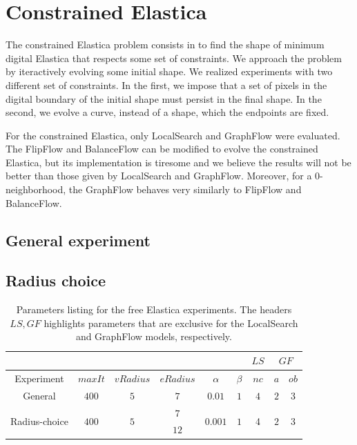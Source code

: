 \section{Constrained Elastica}

The constrained Elastica problem consists in to find the shape of minimum digital Elastica that respects some set of constraints. We approach the problem by iteractively evolving some initial shape. We realized experiments with two different set of constraints. In the first, we impose that a set of pixels in the digital boundary of the initial shape must persist in the final shape. In the second, we evolve a curve, instead of a shape, which the endpoints are fixed. 

For the constrained Elastica, only LocalSearch and GraphFlow were evaluated. The FlipFlow and BalanceFlow can be modified to evolve the constrained Elastica, but its implementation is tiresome and we believe the results will not be better than those given by LocalSearch and GraphFlow. Moreover, for a $0$-neighborhood, the GraphFlow behaves very similarly to FlipFlow and BalanceFlow.

\subsection{General experiment}

\subsection{Radius choice}

\begin{table}
\centering
\begin{tabular}{|c|c|c|c|c|c|c|c|c|}
\cline{7-9}
\multicolumn{6}{c|}{} & $LS$ & \multicolumn{2}{|c|}{$GF$}\\
\hline
Experiment & $maxIt$ & $vRadius$ & $eRadius$ & $\alpha$ & $\beta$  & $nc$ & $a$ & $ob$ \\
\hline
General & $400$ & $5$ & $7$ & $0.01$ & $1$  & $4$  & $2$ & $3$ \\
\hline
\multirow{2}{*}{Radius-choice} & \multirow{2}{*}{$400$} & \multirow{2}{*}{$5$} & $7$ & \multirow{2}{*}{$0.001$} & \multirow{2}{*}{$1$}  & \multirow{2}{*}{4}  & \multirow{2}{*}{$2$} & \multirow{2}{*}{$3$} \\
& &  & $12$ &  & &  & &  \\
\hline
\end{tabular}
\caption{Parameters listing for the free Elastica experiments. The headers $LS,GF$ highlights parameters that are exclusive for the LocalSearch and GraphFlow models, respectively.}
\label{tab:constrained-elastica-parameters-summary}
\end{table}

